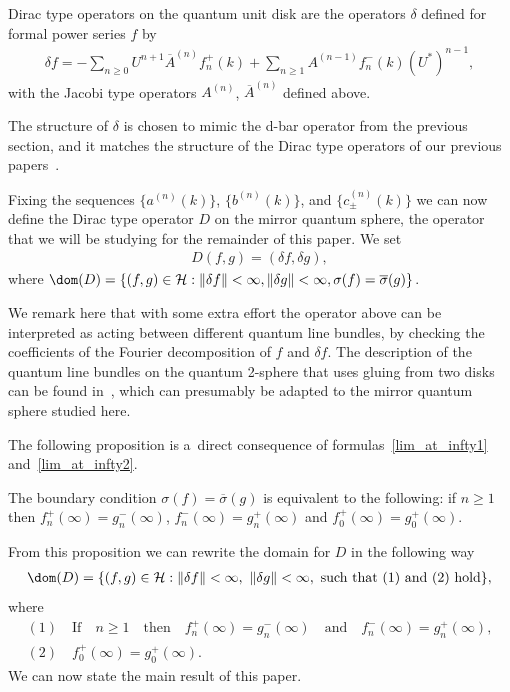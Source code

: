 \begin{defin}
Dirac type operators on the quantum unit disk are the operators $\delta$ def\/ined for formal power series $f$ by
\begin{gather}
\label{quantDTO}
\delta f = -\sum\limits_{n\ge0} U^{n+1} \overline{A}^{(n)}f_n^+(k) + \sum\limits_{n\ge1} A^{(n-1)}f_n^-(k)(U^*)^{n-1},
\end{gather}
with the Jacobi type operators $A^{(n)}$, $\overline {A}^{(n)}$ def\/ined above.
\end{defin}

The structure of $\delta$ is chosen to mimic the d-bar operator from the previous section, and it matches the structure
of the Dirac type operators of our previous papers~\cite{CKW,KM1,KM2,KM4,KM5}.

Fixing the sequences $\{a^{(n)}(k)\}$, $\{b^{(n)}(k)\}$, and $\{c_{\pm}^{(n)}(k)\}$ we can now def\/ine the Dirac type
operator $D$ on the mirror quantum sphere, the operator that we will be studying for the remainder of this paper.
We set
\begin{gather}
\label{quant_dirac_op}
D(f,g) = (\delta f, \delta g),
\end{gather}
where $\dom(D) = \{ (f,g)\in\mathcal{H}: \|\delta f\|<\infty, \|\delta g\|<\infty,\sigma(f) =
\overline{\sigma}(g)\}$.

We remark here that with some extra ef\/fort the operator above can be interpreted as acting between dif\/ferent quantum
line bundles, by checking the coef\/f\/icients of the Fourier decomposition of $f$ and $\delta f$.
The description of the quantum line bundles on the quantum 2-sphere that uses gluing from two disks can be found
in~\cite{Wagner}, which can presumably be adapted to the mirror quantum sphere studied here.

The following proposition is a~direct consequence of formulas~\eqref{lim_at_infty1} and~\eqref{lim_at_infty2}.

\begin{prop}
\label{bndy_cond_quant}
The boundary condition $ \sigma(f) = \overline{\sigma}(g)$ is equivalent to the following: if $n\ge 1$ then
$f_n^+(\infty) = g_n^-(\infty)$,
$f_n^-(\infty) = g_n^+(\infty)$ and $f_0^+(\infty) = g_0^+(\infty)$.
\end{prop}

From this proposition we can rewrite the domain for $D$ in the following way
\begin{gather*}
\dom(D) = \{(f,g)\in\mathcal{H}: \|\delta f\|<\infty,~\|\delta g\|<\infty,~\text{such that}~(1)~\text{and}~(2)~\text{hold}\},
\end{gather*}
where
\begin{gather*}
(1)\quad\text{If}\quad n\ge 1 \quad\text{then}\quad  f_n^+(\infty) = g_n^-(\infty)\quad\text{and}\quad  f_n^-(\infty) = g_n^+(\infty),
\\
(2)\quad f_0^+(\infty) = g_0^+(\infty).
\end{gather*}
We can now state the main result of this paper.

